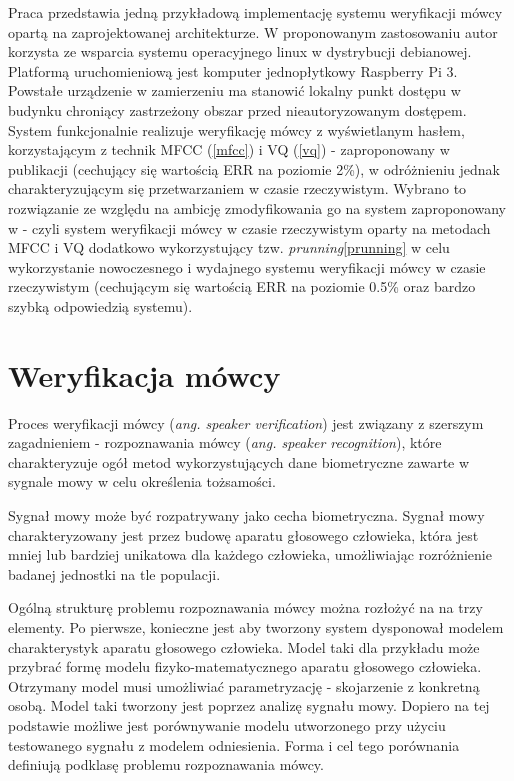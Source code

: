Praca przedstawia jedną przykładową implementację systemu weryfikacji mówcy opartą na zaprojektowanej architekturze. W proponowanym zastosowaniu autor korzysta ze wsparcia systemu operacyjnego linux w dystrybucji debianowej. Platformą uruchomieniową jest komputer jednopłytkowy Raspberry Pi 3. Powstałe urządzenie w zamierzeniu ma stanowić lokalny punkt dostępu w budynku chroniący zastrzeżony obszar przed nieautoryzowanym dostępem. System funkcjonalnie realizuje weryfikację mówcy z wyświetlanym hasłem, korzystającym z technik MFCC (\ref{mfcc}) i VQ (\ref{vq}) - zaproponowany w publikacji \cite{10digits98} (cechujący się wartością ERR na poziomie 2\%), w odróżnieniu jednak charakteryzującym się przetwarzaniem w czasie rzeczywistym. Wybrano to rozwiązanie ze względu na ambicję zmodyfikowania go na system zaproponowany w \cite{finprunning} - czyli system weryfikacji mówcy w czasie rzeczywistym oparty na metodach MFCC i VQ dodatkowo wykorzystujący tzw. \textit{prunning}\ref{prunning} w celu wykorzystanie nowoczesnego i wydajnego systemu weryfikacji mówcy w czasie rzeczywistym (cechującym się wartością ERR na poziomie 0.5\% oraz bardzo szybką odpowiedzią systemu).

\section{Weryfikacja mówcy}
\label{verification}

Proces weryfikacji mówcy (\textit{ang. speaker verification}) jest związany z szerszym zagadnieniem - rozpoznawania mówcy (\textit{ang. speaker recognition}), które charakteryzuje ogół metod wykorzystujących dane biometryczne zawarte w sygnale mowy w celu określenia tożsamości.

Sygnał mowy może być rozpatrywany jako cecha biometryczna. Sygnał mowy charakteryzowany jest przez budowę aparatu głosowego człowieka, która jest mniej lub bardziej unikatowa dla każdego człowieka, umożliwiając rozróżnienie badanej jednostki na tle populacji.

Ogólną strukturę problemu rozpoznawania mówcy można rozłożyć na na trzy elementy.\cite{fosr} Po pierwsze, konieczne jest aby tworzony system dysponował modelem charakterystyk aparatu głosowego człowieka. Model taki dla przykładu może przybrać formę modelu fizyko-matematycznego aparatu głosowego człowieka. Otrzymany model musi umożliwiać parametryzację - skojarzenie z konkretną osobą. Model taki tworzony jest poprzez analizę sygnału mowy. Dopiero na tej podstawie możliwe jest porównywanie modelu utworzonego przy użyciu testowanego sygnału z modelem odniesienia. Forma i cel tego porównania definiują podklasę problemu rozpoznawania mówcy.

